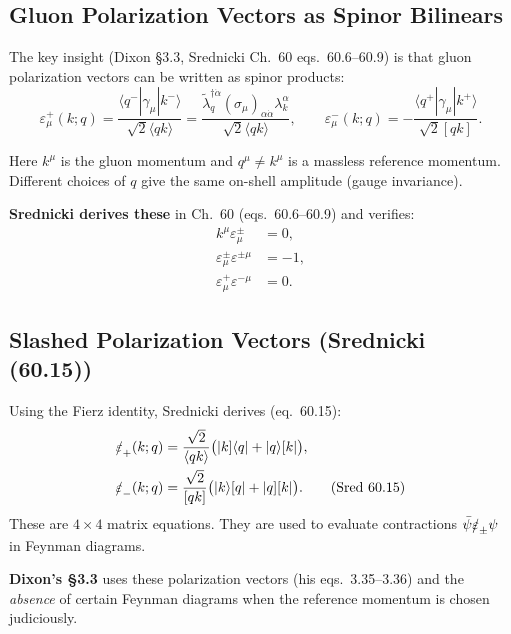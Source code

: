 \subsection{Gluon Polarization Vectors as Spinor Bilinears}

The key insight (Dixon \S3.3, Srednicki Ch.~60 eqs.~60.6--60.9) is that gluon
polarization vectors can be written as spinor products:
\begin{equation}
  \varepsilon_\mu^+(k;q)
  = \frac{\langle q^-|\gamma_\mu|k^-\rangle}{\sqrt{2}\langle qk\rangle}
  = \frac{\tilde\lambda_q^{\dagger\dot\alpha}(\sigma_\mu)_{\alpha\dot\alpha}\lambda_k^\alpha}
         {\sqrt{2}\langle qk\rangle},
  \qquad
  \varepsilon_\mu^-(k;q)
  = -\frac{\langle q^+|\gamma_\mu|k^+\rangle}{\sqrt{2}[qk]}.
  \tag{Dixon 3.3.1 / Sred 60.6}
\end{equation}

Here $k^\mu$ is the gluon momentum and $q^\mu\neq k^\mu$ is a massless reference momentum.
Different choices of $q$ give the same on-shell amplitude (gauge invariance).

\textbf{Srednicki derives these} in Ch.~60 (eqs.~60.6--60.9) and verifies:
\begin{align}
  k^\mu\varepsilon_\mu^\pm &= 0, \tag{transversality, Sred 60.7}\\
  \varepsilon^\pm_\mu\varepsilon^{\pm\mu} &= -1, \tag{normalization, Sred 60.8}\\
  \varepsilon^+_\mu\varepsilon^{-\mu} &= 0. \tag{orthogonality, Sred 60.9}
\end{align}

\subsection{Slashed Polarization Vectors (Srednicki (60.15))}

Using the Fierz identity, Srednicki derives (eq.~60.15):
\begin{align}
  \slashed\varepsilon_+(k;q) &= \frac{\sqrt{2}}{\langle qk\rangle}
    \bigl(|k]\langle q| + |q\rangle[k|\bigr), \\
  \slashed\varepsilon_-(k;q) &= \frac{\sqrt{2}}{[qk]}
    \bigl(|k\rangle[q| + |q][k|\bigr).
  \tag{Sred 60.15}
\end{align}
These are $4\times4$ matrix equations. They are used to evaluate contractions
$\bar\psi\slashed\varepsilon_\pm\psi$ in Feynman diagrams.

\textbf{Dixon's \S3.3} uses these polarization vectors (his eqs.~3.35--3.36) and the
\emph{absence} of certain Feynman diagrams when the reference momentum is chosen judiciously.

